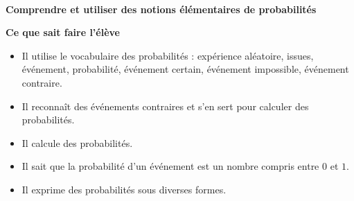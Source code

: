 \documentclass[10pt]{article}
\newcommand{\RR}{\begin{tikzpicture} \draw[BleuRoi,fill=BleuRoi] (0,0) circle (0.06); \end{tikzpicture}}
\newcommand{\competence}[1]{\par\color{BleuRoi}\makebox[\linewidth]{\rule{\textwidth}{2pt}}\\{\bfseries\Large#1}\color{black}\vspace{1em}}
\newenvironment{savoireleves}{%
    \renewcommand{\labelitemi}{\RR}%
    \color{black}%
    \par\textbf{Ce que sait faire l'élève}
    \begin{itemize}
    \setlength{\itemsep}{-0.2em}%
}{
    \end{itemize}
}
\begin{document}
    \competence{Comprendre et utiliser des notions élémentaires de probabilités}
    \begin{savoireleves}
        \item Il utilise le vocabulaire des probabilités : expérience aléatoire, issues, événement, probabilité, événement certain, événement impossible, événement contraire.
        \item Il reconnaît des événements contraires et s’en sert pour calculer des probabilités.
        \item Il calcule des probabilités.
        \item Il sait que la probabilité d’un événement est un nombre compris entre $0$ et $1$.
        \item Il exprime des probabilités sous diverses formes.
    \end{savoireleves}
\end{document}
